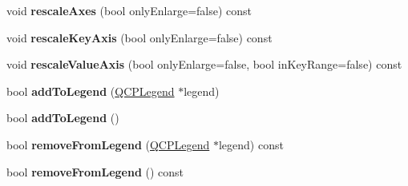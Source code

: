 \begin{DoxyCompactItemize}
\item 
void {\bfseries rescale\+Axes} (bool only\+Enlarge=false) const \hypertarget{class_q_c_p_abstract_plottable_a7e8fc3be43c27ccacd70a7bf9d74a5cd}{}\label{class_q_c_p_abstract_plottable_a7e8fc3be43c27ccacd70a7bf9d74a5cd}

\item 
void {\bfseries rescale\+Key\+Axis} (bool only\+Enlarge=false) const \hypertarget{class_q_c_p_abstract_plottable_a1acecfcca3e7fcda00fcbaa3c886386f}{}\label{class_q_c_p_abstract_plottable_a1acecfcca3e7fcda00fcbaa3c886386f}

\item 
void {\bfseries rescale\+Value\+Axis} (bool only\+Enlarge=false, bool in\+Key\+Range=false) const \hypertarget{class_q_c_p_abstract_plottable_a4336ede4d4ef615022356316d9e9c362}{}\label{class_q_c_p_abstract_plottable_a4336ede4d4ef615022356316d9e9c362}

\item 
bool {\bfseries add\+To\+Legend} (\hyperlink{class_q_c_p_legend}{Q\+C\+P\+Legend} $\ast$legend)\hypertarget{class_q_c_p_abstract_plottable_aa64e93cb5b606d8110d2cc0a349bb30f}{}\label{class_q_c_p_abstract_plottable_aa64e93cb5b606d8110d2cc0a349bb30f}

\item 
bool {\bfseries add\+To\+Legend} ()\hypertarget{class_q_c_p_abstract_plottable_a70f8cabfd808f7d5204b9f18c45c13f5}{}\label{class_q_c_p_abstract_plottable_a70f8cabfd808f7d5204b9f18c45c13f5}

\item 
bool {\bfseries remove\+From\+Legend} (\hyperlink{class_q_c_p_legend}{Q\+C\+P\+Legend} $\ast$legend) const \hypertarget{class_q_c_p_abstract_plottable_a26d936d11852ea08e6bc0edae3a514a2}{}\label{class_q_c_p_abstract_plottable_a26d936d11852ea08e6bc0edae3a514a2}

\item 
bool {\bfseries remove\+From\+Legend} () const \hypertarget{class_q_c_p_abstract_plottable_aa1f350e510326d012b9a9c9249736c83}{}\label{class_q_c_p_abstract_plottable_aa1f350e510326d012b9a9c9249736c83}

\end{DoxyCompactItemize}
